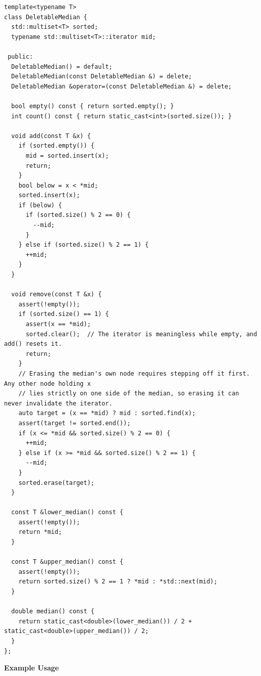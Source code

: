 \begin{lstlisting}[style=cpp]
template<typename T>
class DeletableMedian {
  std::multiset<T> sorted;
  typename std::multiset<T>::iterator mid;

 public:
  DeletableMedian() = default;
  DeletableMedian(const DeletableMedian &) = delete;
  DeletableMedian &operator=(const DeletableMedian &) = delete;

  bool empty() const { return sorted.empty(); }
  int count() const { return static_cast<int>(sorted.size()); }

  void add(const T &x) {
    if (sorted.empty()) {
      mid = sorted.insert(x);
      return;
    }
    bool below = x < *mid;
    sorted.insert(x);
    if (below) {
      if (sorted.size() % 2 == 0) {
        --mid;
      }
    } else if (sorted.size() % 2 == 1) {
      ++mid;
    }
  }

  void remove(const T &x) {
    assert(!empty());
    if (sorted.size() == 1) {
      assert(x == *mid);
      sorted.clear();  // The iterator is meaningless while empty, and add() resets it.
      return;
    }
    // Erasing the median's own node requires stepping off it first. Any other node holding x
    // lies strictly on one side of the median, so erasing it can never invalidate the iterator.
    auto target = (x == *mid) ? mid : sorted.find(x);
    assert(target != sorted.end());
    if (x <= *mid && sorted.size() % 2 == 0) {
      ++mid;
    } else if (x >= *mid && sorted.size() % 2 == 1) {
      --mid;
    }
    sorted.erase(target);
  }

  const T &lower_median() const {
    assert(!empty());
    return *mid;
  }

  const T &upper_median() const {
    assert(!empty());
    return sorted.size() % 2 == 1 ? *mid : *std::next(mid);
  }

  double median() const {
    return static_cast<double>(lower_median()) / 2 + static_cast<double>(upper_median()) / 2;
  }
};
\end{lstlisting}
\textbf{Example Usage}\par
